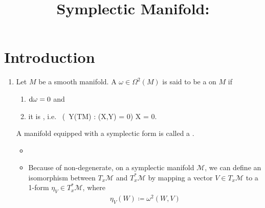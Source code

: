 \documentclass{article}
\title{Symplectic Manifold:}
\begin{document}


\maketitle



\section{Introduction}
\begin{enumerate}
    \item {} Let $M$ be a smooth manifold. A  $\omega\in\Omega^2(M)$ is said to be a  on $M$ if
\begin{enumerate}
    \item $\mathrm{d} \omega = 0$ and
    \item it is , i.e.\
\bse
(\forall \, Y\in \Gamma(TM) : \omega(X,Y) = 0) \Rightarrow X = 0.
\ese
\end{enumerate} 
A manifold equipped with a symplectic form is called a .
\begin{itemize}
    \item {} 
    \item Because of non-degenerate, on a symplectic manifold $\mathcal{M}$, we can define an isomorphism between $T_x \mathcal{M}$ and $T_x^* \mathcal{M}$ by mapping a vector $V \in T_x \mathcal{M}$ to a 1-form $\eta_V \in T_x^* \mathcal{M}$, where
\begin{align*}
\eta_V(W)\coloneqq \omega^2(W, V)
\end{align*}
\end{itemize}


\end{enumerate}
\end{document}
